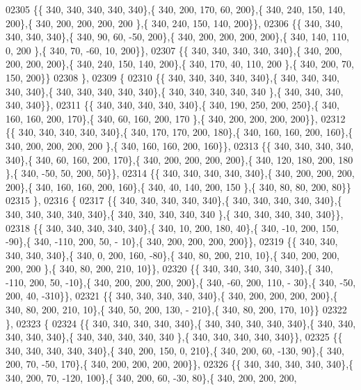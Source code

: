 \begin{DoxyCode}
02305 \{\{ 340, 340, 340, 340, 340\},\{ 340, 200, 170,  60, 200\},\{ 340, 240, 150, 140, 200\},\{ 340, 200, 200, 200, 200
      \},\{ 340, 240, 150, 140, 200\}\},
02306 \{\{ 340, 340, 340, 340, 340\},\{ 340,  90,  60, -50, 200\},\{ 340, 200, 200, 200, 200\},\{ 340, 140, 110,   0, 200
      \},\{ 340,  70, -60,  10, 200\}\},
02307 \{\{ 340, 340, 340, 340, 340\},\{ 340, 200, 200, 200, 200\},\{ 340, 240, 150, 140, 200\},\{ 340, 170,  40, 110, 200
      \},\{ 340, 200,  70, 150, 200\}\}
02308 \},
02309 \{
02310 \{\{ 340, 340, 340, 340, 340\},\{ 340, 340, 340, 340, 340\},\{ 340, 340, 340, 340, 340\},\{ 340, 340, 340, 340, 340
      \},\{ 340, 340, 340, 340, 340\}\},
02311 \{\{ 340, 340, 340, 340, 340\},\{ 340, 190, 250, 200, 250\},\{ 340, 160, 160, 200, 170\},\{ 340,  60, 160, 200, 170
      \},\{ 340, 200, 200, 200, 200\}\},
02312 \{\{ 340, 340, 340, 340, 340\},\{ 340, 170, 170, 200, 180\},\{ 340, 160, 160, 200, 160\},\{ 340, 200, 200, 200, 200
      \},\{ 340, 160, 160, 200, 160\}\},
02313 \{\{ 340, 340, 340, 340, 340\},\{ 340,  60, 160, 200, 170\},\{ 340, 200, 200, 200, 200\},\{ 340, 120, 180, 200, 180
      \},\{ 340, -50,  50, 200,  50\}\},
02314 \{\{ 340, 340, 340, 340, 340\},\{ 340, 200, 200, 200, 200\},\{ 340, 160, 160, 200, 160\},\{ 340,  40, 140, 200, 150
      \},\{ 340,  80,  80, 200,  80\}\}
02315 \},
02316 \{
02317 \{\{ 340, 340, 340, 340, 340\},\{ 340, 340, 340, 340, 340\},\{ 340, 340, 340, 340, 340\},\{ 340, 340, 340, 340, 340
      \},\{ 340, 340, 340, 340, 340\}\},
02318 \{\{ 340, 340, 340, 340, 340\},\{ 340,  10, 200, 180,  40\},\{ 340, -10, 200, 150, -90\},\{ 340, -110, 200,  50, -
      10\},\{ 340, 200, 200, 200, 200\}\},
02319 \{\{ 340, 340, 340, 340, 340\},\{ 340,   0, 200, 160, -80\},\{ 340,  80, 200, 210,  10\},\{ 340, 200, 200, 200, 200
      \},\{ 340,  80, 200, 210,  10\}\},
02320 \{\{ 340, 340, 340, 340, 340\},\{ 340, -110, 200,  50, -10\},\{ 340, 200, 200, 200, 200\},\{ 340, -60, 200, 110, -
      30\},\{ 340, -50, 200,  40, -310\}\},
02321 \{\{ 340, 340, 340, 340, 340\},\{ 340, 200, 200, 200, 200\},\{ 340,  80, 200, 210,  10\},\{ 340,  50, 200, 130, -
      210\},\{ 340,  80, 200, 170,  10\}\}
02322 \},
02323 \{
02324 \{\{ 340, 340, 340, 340, 340\},\{ 340, 340, 340, 340, 340\},\{ 340, 340, 340, 340, 340\},\{ 340, 340, 340, 340, 340
      \},\{ 340, 340, 340, 340, 340\}\},
02325 \{\{ 340, 340, 340, 340, 340\},\{ 340, 200, 150,   0, 210\},\{ 340, 200,  60, -130,  90\},\{ 340, 200,  70, -50, 
      170\},\{ 340, 200, 200, 200, 200\}\},
02326 \{\{ 340, 340, 340, 340, 340\},\{ 340, 200,  70, -120, 100\},\{ 340, 200,  60, -30,  80\},\{ 340, 200, 200, 200, 

\end{DoxyCode}
